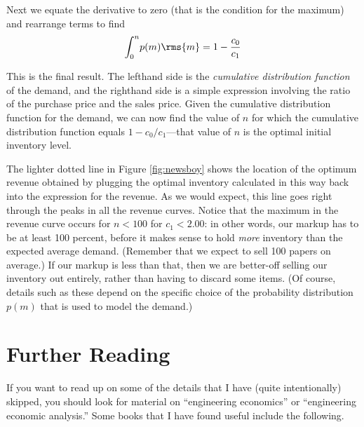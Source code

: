 Next we equate the derivative to zero (that is the condition for the
maximum) and rearrange terms to find
%
\[
\int_0^n \! p(m) \rms{m} = 1 - \frac{c_0}{c_1}
\]
%

This is the final result. The lefthand side is the \emph{cumulative
  distribution function} of the demand, and the righthand side is a
simple expression involving the ratio of the purchase price and the
sales price. Given the cumulative distribution function for the
demand, we can now find the value of $n$ for which the cumulative
distribution function equals $1-c_0/c_1$---that value of $n$ is the
optimal initial inventory level.

The lighter dotted line in Figure \ref{fig:newsboy} shows the location
of the optimum revenue obtained by plugging the optimal inventory
calculated in this way back into the expression for the revenue. As we
would expect, this line goes right through the peaks in all the
revenue curves.  Notice that the maximum in the revenue curve occurs
for $n < 100$ for $c_1 < 2.00$: in other words, our markup has to be
at least 100 percent, before it makes sense to hold \emph{more}
inventory than the expected average demand. (Remember that we expect
to sell 100 papers on average.) If our markup is less than that, then
we are better-off selling our inventory out entirely, rather than
having to discard some items.  (Of course, details such as these
depend on the specific choice of the probability distribution $p(m)$
that is used to model the demand.)


\vspace*{10pt}
\section{Further Reading}

If you want to read up on some of the details that I have (quite
intentionally) skipped, you should look for material on ``engineering
economics'' or ``engineering economic analysis.''  Some books that I
have found useful include the following.

